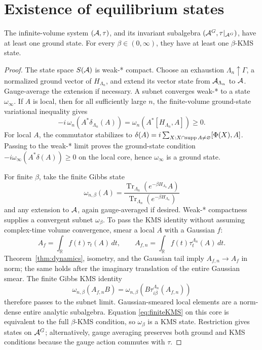 \section{Existence of equilibrium states}

\begin{theorem}
\label{thm:states}
The infinite-volume system \((\mathcal A,\tau)\), and its invariant subalgebra
\((\mathcal A^G,\tau|_{\mathcal A^G})\), have at least one ground state.  For every
\(\beta\in(0,\infty)\), they have at least one \(\beta\)-KMS state.
\end{theorem}

\begin{proof}
The state space \(S(\mathcal A)\) is weak-* compact.  Choose an exhaustion
\(\Lambda_n\uparrow\Gamma\), a normalized ground vector of \(H_{\Lambda_n}\),
and extend its vector state from \(\mathcal A_{\Lambda_n}\) to \(\mathcal A\).  Gauge-average
the extension if necessary.  A subnet converges weak-* to a state
\(\omega_\infty\).  If \(A\) is local, then for all sufficiently large
\(n\), the finite-volume ground-state variational inequality gives
\[
 -i\,\omega_n(A^*\delta_{\Lambda_n}(A))
 =\omega_n\!\left(A^*[H_{\Lambda_n},A]\right)\geq0.
\tag{5.1}\label{eq:groundineq}
\]
For local \(A\), the commutator stabilizes to
\(\delta(A)=i\sum_{X:X\cap\operatorname{supp} A\ne\varnothing}[\Phi(X),A]\).
Passing to the weak-* limit proves the ground-state condition
\(-i\omega_\infty(A^*\delta(A))\geq0\) on the local core, hence
\(\omega_\infty\) is a ground state.

For finite \(\beta\), take the finite Gibbs state
\[
 \omega_{n,\beta}(A)=
 \frac{\operatorname{Tr}_{\Lambda_n}
 (e^{-\beta H_{\Lambda_n}}A)}
 {\operatorname{Tr}_{\Lambda_n}(e^{-\beta H_{\Lambda_n}})}
\tag{5.2}\label{eq:gibbs}
\]
and any extension to \(\mathcal A\), again gauge-averaged if desired.  Weak-*
compactness supplies a convergent subnet \(\omega_\beta\).
To pass the KMS identity without assuming complex-time volume convergence,
smear a local \(A\) with a Gaussian \(f\):
\[
 A_f=\int_{\mathbb R}f(t)\tau_t(A)\,dt,\qquad
 A_{f,n}=\int_{\mathbb R}f(t)\tau_t^{\Lambda_n}(A)\,dt.
\tag{5.3}\label{eq:smear}
\]
Theorem~\ref{thm:dynamics}, isometry, and the Gaussian tail imply
\(A_{f,n}\to A_f\) in norm; the same holds after the imaginary translation
of the entire Gaussian smear.  The finite Gibbs KMS identity
\[
 \omega_{n,\beta}(A_{f,n}B)
 =\omega_{n,\beta}\!\left(B\tau_{i\beta}^{\Lambda_n}(A_{f,n})\right)
\tag{5.4}\label{eq:finiteKMS}
\]
therefore passes to the subnet limit.  Gaussian-smeared local elements are
a norm-dense entire analytic subalgebra.  Equation
\eqref{eq:finiteKMS} on this core is equivalent to the full
\(\beta\)-KMS condition, so \(\omega_\beta\) is a KMS state.
Restriction gives states on \(\mathcal A^G\); alternatively, gauge averaging
preserves both ground and KMS conditions because the gauge action commutes
with \(\tau\).
\end{proof}

